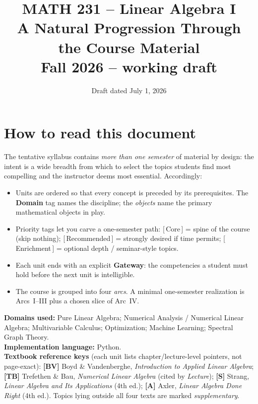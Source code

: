 \documentclass[11pt]{article}
\title{\vspace{-1.2cm}\textbf{\sffamily MATH 231 -- Linear Algebra I}\\[4pt]
       {\large\sffamily A Natural Progression Through the Course Material}\\[2pt]
       {\normalsize\sffamily Fall 2026 -- working draft}}
\author{}
\date{\normalsize\sffamily Draft dated July 1, 2026}
\newcommand{\dom}[1]{{\sffamily\bfseries\color{RoyalBlue}#1}}
\newcommand{\pri}[1]{{\footnotesize\sffamily\color{BrickRed}[\,#1\,]}}
\newcommand{\obj}[1]{{\itshape #1}}
\theoremstyle{definition}
\begin{document}
\maketitle
\vspace{-1.2cm}

\section*{How to read this document}
The tentative syllabus contains \emph{more than one semester} of material by
design: the intent is a wide breadth from which to select the topics students
find most compelling and the instructor deems most essential.  Accordingly:

\begin{itemize}[leftmargin=1.4em,itemsep=2pt]
  \item Units are ordered so that every concept is preceded by its prerequisites.
        The \dom{Domain} tag names the discipline; the \obj{objects} name the
        primary mathematical objects in play.
  \item Priority tags let you carve a one-semester path:
        \pri{Core} = spine of the course (skip nothing);
        \pri{Recommended} = strongly desired if time permits;
        \pri{Enrichment} = optional depth / seminar-style topics.
  \item Each unit ends with an explicit \textbf{Gateway}: the competencies a
        student must hold before the next unit is intelligible.
  \item The course is grouped into four \emph{arcs}. A minimal one-semester
        realization is Arcs~I--III plus a chosen slice of Arc~IV.
\end{itemize}

\noindent\textbf{Domains used:} Pure Linear Algebra; Numerical Analysis /
Numerical Linear Algebra; Multivariable Calculus; Optimization; Machine
Learning; Spectral Graph Theory.\\[2pt]
\textbf{Implementation language:} Python.\\[4pt]
\textbf{Textbook reference keys} (each unit lists chapter/lecture-level pointers,
not page-exact):
\textbf{[BV]} Boyd \& Vandenberghe, \emph{Introduction to Applied Linear Algebra};
\textbf{[TB]} Trefethen \& Bau, \emph{Numerical Linear Algebra} (cited by
\emph{Lecture});
\textbf{[S]} Strang, \emph{Linear Algebra and Its Applications} (4th ed.);
\textbf{[A]} Axler, \emph{Linear Algebra Done Right} (4th ed.).
Topics lying outside all four texts are marked \emph{supplementary}.
\end{document}
